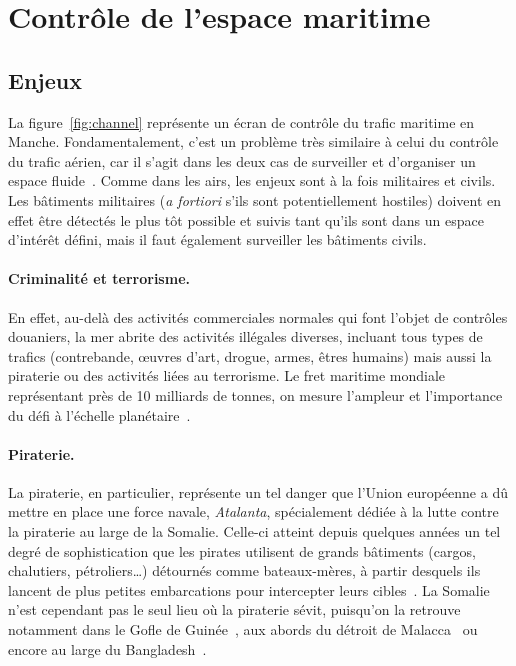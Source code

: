 	
	\section{Contrôle de l'espace maritime}
	\subsection{Enjeux}
	La figure~\ref{fig:channel} représente un écran de contrôle du trafic maritime en Manche. Fondamentalement, c'est un problème très similaire à celui du contrôle du trafic aérien, car il s'agit dans les deux cas de surveiller et d'organiser un espace fluide~\cite{henninger2012avant}. Comme dans les airs, les enjeux sont à la fois militaires et civils. Les bâtiments militaires (\emph{a fortiori} s'ils sont potentiellement hostiles) doivent en effet être détectés le plus tôt possible et suivis tant qu'ils sont dans un espace d'intérêt défini, mais il faut également surveiller les bâtiments civils.
	
	\paragraph{Criminalité et terrorisme.}
	En effet, au-delà des activités commerciales normales qui font l'objet de contrôles douaniers, la mer abrite des activités illégales diverses, incluant tous types de trafics (contrebande, œuvres d'art, drogue, armes, êtres humains) mais aussi la piraterie ou des activités liées au terrorisme.
	Le fret maritime mondiale représentant près de 10 milliards de tonnes, on mesure l'ampleur et l'importance du défi à l'échelle planétaire~\cite{unctad}.
	
	\paragraph{Piraterie.}
	La piraterie, en particulier, représente un tel danger que l'Union européenne a dû mettre en place une force navale, \emph{Atalanta}\footnotemark, spécialement dédiée à la lutte contre la piraterie au large de la Somalie. Celle-ci atteint depuis quelques années un tel degré de sophistication que les pirates utilisent de grands bâtiments (cargos, chalutiers, pétroliers\ldots{}) détournés comme bateaux-mères, à partir desquels ils lancent de plus petites embarcations pour intercepter leurs cibles~\cite{audebaud2010lutte, guisnel2012pirates, dumas2015}. La Somalie n'est cependant pas le seul lieu où la piraterie sévit, puisqu'on la retrouve notamment dans le Gofle de Guinée~\cite{onuoha2012piracy}, aux abords du détroit de Malacca~\cite{raymond2009piracy} ou encore au large du Bangladesh~\cite{liss2011oceans}.
	
